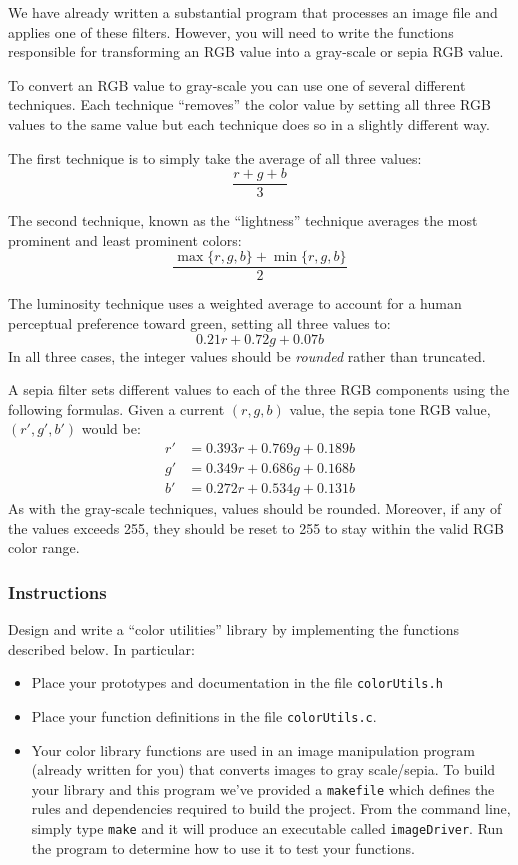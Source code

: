 \documentclass[12pt]{scrartcl}
\begin{document}
We have already written a substantial program that processes an image
file and applies one of these filters.  However, you will need to write
the functions responsible for transforming an RGB value into a gray-scale
or sepia RGB value.  

To convert an RGB value to gray-scale you can use one of several
different techniques.  Each technique ``removes'' the color value by
setting all three RGB values to the same value but each technique 
does so in a slightly different way.

The first technique is to simply take the average of all three values:
  $$\frac{r + g + b}{3}$$

The second technique, known as the ``lightness'' technique averages 
the most prominent and least prominent colors:
  $$\frac{\max\{r, g, b\} + \min\{r, g, b\}}{2}$$

The luminosity technique uses a weighted average to account for a human 
perceptual preference toward green, setting all three values to:
  $$0.21 r + 0.72 g + 0.07 b$$
In all three cases, the integer values should be \emph{rounded} rather 
than truncated.

A sepia filter sets different values to each of the three RGB components 
using the following formulas.  Given a current $(r,g,b)$ value, the sepia
tone RGB value, $(r',g',b')$ would be:
$$\begin{array}{ll}
  r' &= 0.393r + 0.769g + 0.189b \\
  g' &= 0.349r + 0.686g + 0.168b \\
  b' &= 0.272r + 0.534g + 0.131b
\end{array}$$
As with the gray-scale techniques, values should be rounded.  Moreover, if
any of the values exceeds 255, they should be reset to 255 to stay within
the valid RGB color range.

\subsubsection*{Instructions}

Design and write a ``color utilities'' library by implementing the 
functions described below.  In particular:
\begin{itemize}
  \item Place your prototypes and documentation in the file
  \texttt{colorUtils.h}
  \item Place your function definitions in the file 
  \texttt{colorUtils.c}.  
  \item Your color library functions are used in an image manipulation
  program (already written for you) that converts images to 
  gray scale/sepia.  To build your library and this program we've
  provided a \texttt{makefile} which defines the rules
  and dependencies required to build the project.  From the command
  line, simply type \texttt{make} and it will produce an
  executable called \texttt{imageDriver}.  Run the program
  to determine how to use it to test your functions.
\end{itemize}
\end{document}
